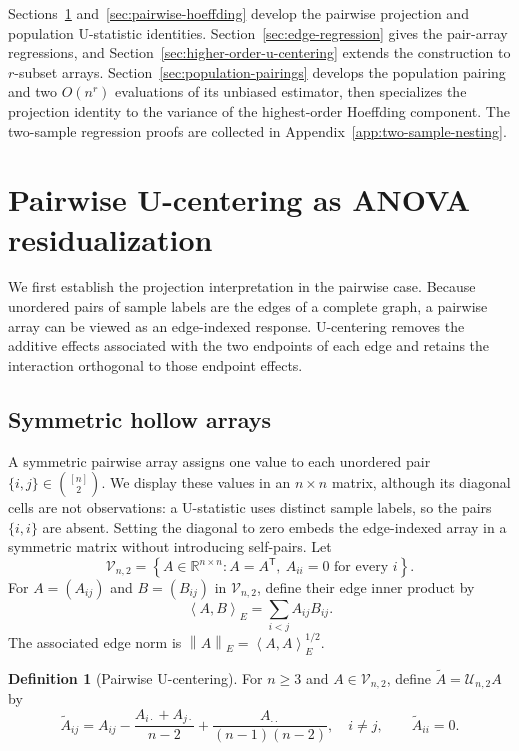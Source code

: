\documentclass[11pt]{article}
\theoremstyle{plain}
\theoremstyle{definition}
\newtheorem{definition}[theorem]{Definition}
\theoremstyle{remark}
\newcommand{\R}{\mathbb R}
\newcommand{\cU}{\mathcal U}
\newcommand{\cV}{\mathcal V}
\newcommand{\inner}[2]{\left\langle #1,#2\right\rangle}
\newcommand{\norm}[1]{\left\lVert #1\right\rVert}
\begin{document}
Sections~\ref{sec:pairwise-anova} and~\ref{sec:pairwise-hoeffding} develop the
pairwise projection and population U-statistic identities.
Section~\ref{sec:edge-regression} gives the pair-array regressions, and
Section~\ref{sec:higher-order-u-centering} extends the construction to
$r$-subset arrays.  Section~\ref{sec:population-pairings} develops the
population pairing and two $O(n^r)$ evaluations of its unbiased estimator,
then specializes the projection identity to the variance of the highest-order
Hoeffding component.  The
two-sample regression proofs are collected in
Appendix~\ref{app:two-sample-nesting}.

\section{Pairwise U-centering as ANOVA residualization}
\label{sec:pairwise-anova}

We first establish the projection interpretation in the pairwise case.
Because unordered pairs of sample labels are the edges of a complete graph,
a pairwise array can be viewed as an edge-indexed response.  U-centering
removes the additive effects associated with the two endpoints of each edge
and retains the interaction orthogonal to those endpoint effects.

\subsection{Symmetric hollow arrays}
A symmetric pairwise array assigns one value to each unordered pair
$\{i,j\}\in\binom{[n]}2$.  We display these values in an $n\times n$ matrix,
although its diagonal cells are not observations: a U-statistic uses distinct
sample labels, so the pairs $\{i,i\}$ are absent.  Setting the diagonal to
zero embeds the edge-indexed array in a symmetric matrix without introducing
self-pairs.  Let
\[
 \cV_{n,2}
 =\left\{A\in\R^{n\times n}:A=A^\mathsf T,\ A_{ii}=0
   \text{ for every }i\right\}.
\]
For $A=(A_{ij})$ and $B=(B_{ij})$ in $\cV_{n,2}$, define their edge inner
product by
\begin{equation}\label{eq:edge-inner}
  \inner{A}{B}_{E}=\sum_{i<j}A_{ij}B_{ij}.
\end{equation}
The associated edge norm is $\norm{A}_E=\inner{A}{A}_E^{1/2}$.
\begin{definition}[Pairwise U-centering]\label{def:pairwise-u}
For $n\ge3$ and $A\in\cV_{n,2}$, define $\widetilde A=\cU_{n,2}A$ by
\begin{equation}\label{eq:pairwise-u}
 \widetilde A_{ij}
 =A_{ij}-\frac{A_{i\cdot}+A_{j\cdot}}{n-2}
       +\frac{A_{\cdot\cdot}}{(n-1)(n-2)},
 \quad i\ne j,
 \qquad
 \widetilde A_{ii}=0.
\end{equation}
\end{definition}
\end{document}
